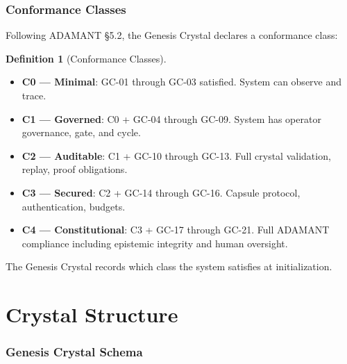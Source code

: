 \documentclass[11pt,a4paper,twoside]{article}
\theoremstyle{definition}
\newtheorem{definition}{Definition}[section]
\theoremstyle{plain}
\theoremstyle{remark}
\newcommand{\ADAMANT}{\textsf{ADAMANT}}
\begin{document}
\section{Conformance Classes}\label{sec:conformance}

Following \ADAMANT{} \S5.2, the Genesis Crystal declares a
conformance class:

\begin{definition}[Conformance Classes]\label{def:confclass}
\begin{itemize}[nosep]
  \item \textbf{C0 --- Minimal}: GC-01 through GC-03 satisfied.
        System can observe and trace.
  \item \textbf{C1 --- Governed}: C0 + GC-04 through GC-09.
        System has operator governance, gate, and cycle.
  \item \textbf{C2 --- Auditable}: C1 + GC-10 through GC-13.
        Full crystal validation, replay, proof obligations.
  \item \textbf{C3 --- Secured}: C2 + GC-14 through GC-16.
        Capsule protocol, authentication, budgets.
  \item \textbf{C4 --- Constitutional}: C3 + GC-17 through GC-21.
        Full \ADAMANT{} compliance including epistemic integrity
        and human oversight.
\end{itemize}
The Genesis Crystal records which class the system satisfies at
initialization.
\end{definition}


\part{Crystal Structure}\label{part:structure}

\section{Genesis Crystal Schema}\label{sec:schema}
\end{document}
